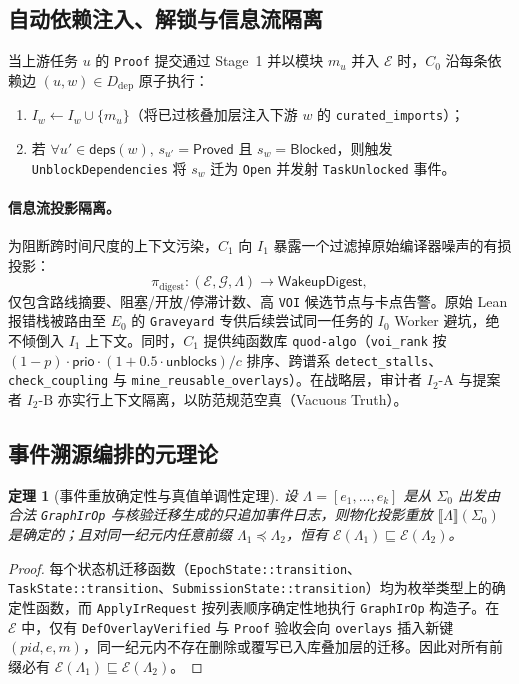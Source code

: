 \documentclass[10pt,a4paper,fontset=fandol]{ctexart}
\newtheorem{theorem}{定理}[section]
\newcommand{\Truth}{\mathcal{E}}
\newcommand{\Orch}{\mathcal{G}}
\newcommand{\Events}{\Lambda}
\newcommand{\kw}[1]{\mathsf{#1}}
\newcommand{\code}[1]{\texttt{#1}}
\begin{document}
\subsection{自动依赖注入、解锁与信息流隔离}
当上游任务 $u$ 的 \code{Proof} 提交通过 Stage~1 并以模块 $m_u$ 并入 $\Truth$ 时，$C_0$ 沿每条依赖边 $(u, w) \in D_{\mathrm{dep}}$ 原子执行：
\begin{enumerate}
  \item $I_w \leftarrow I_w \cup \{m_u\}$（将已过核叠加层注入下游 $w$ 的 \code{curated\_imports}）；
  \item 若 $\forall u' \in \kw{deps}(w),\, s_{u'} = \kw{Proved}$ 且 $s_w = \kw{Blocked}$，则触发 \code{UnblockDependencies} 将 $s_w$ 迁为 \code{Open} 并发射 \code{TaskUnlocked} 事件。
\end{enumerate}

\paragraph{信息流投影隔离。}
为阻断跨时间尺度的上下文污染，$C_1$ 向 $I_1$ 暴露一个过滤掉原始编译器噪声的有损投影：
\[
\pi_{\mathrm{digest}} : (\Truth, \Orch, \Events) \to \kw{WakeupDigest},
\]
仅包含路线摘要、阻塞/开放/停滞计数、高 \code{VOI} 候选节点与卡点告警。原始 Lean 报错栈被路由至 $E_0$ 的 \code{Graveyard} 专供后续尝试同一任务的 $I_0$ Worker 避坑，绝不倾倒入 $I_1$ 上下文。同时，$C_1$ 提供纯函数库 \code{quod-algo}（\code{voi\_rank} 按 $(1-p)\cdot\kw{prio}\cdot(1+0.5\cdot\kw{unblocks})/c$ 排序、跨谱系 \code{detect\_stalls}、\code{check\_coupling} 与 \code{mine\_reusable\_overlays}）。在战略层，审计者 $I_2\text{-A}$ 与提案者 $I_2\text{-B}$ 亦实行上下文隔离，以防范规范空真（Vacuous Truth）。

\subsection{事件溯源编排的元理论}

\begin{theorem}[事件重放确定性与真值单调性定理]\label{thm:replay}
设 $\Events = [e_1, \dots, e_k]$ 是从 $\Sigma_0$ 出发由合法 \code{GraphIrOp} 与核验迁移生成的只追加事件日志，则物化投影重放 $\llbracket \Events \rrbracket(\Sigma_0)$ 是确定的；且对同一纪元内任意前缀 $\Events_1 \preceq \Events_2$，恒有 $\Truth(\Events_1) \sqsubseteq \Truth(\Events_2)$。
\end{theorem}

\begin{proof}
每个状态机迁移函数（\code{EpochState::\-transition}、\code{TaskState::\-transition}、\code{SubmissionState::\-transition}）均为枚举类型上的确定性函数，而 \code{ApplyIrRequest} 按列表顺序确定性地执行 \code{GraphIrOp} 构造子。在 $\Truth$ 中，仅有 \code{DefOverlayVerified} 与 \code{Proof} 验收会向 \code{overlays} 插入新键 $(pid, e, m)$，同一纪元内不存在删除或覆写已入库叠加层的迁移。因此对所有前缀必有 $\Truth(\Events_1) \sqsubseteq \Truth(\Events_2)$。
\end{proof}
\end{document}
